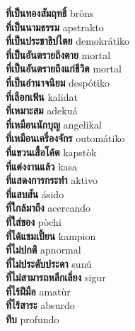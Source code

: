 \textbf{ ที่เป็นทองสัมฤทธิ์  } bròns \\
\textbf{ ที่เป็นนามธรรม  } apstrakto \\
\textbf{ ที่เป็นประชาธิปไตย  } demokrátiko \\
\textbf{ ที่เป็นอันตรายถึงตาย  } mortal \\
\textbf{ ที่เป็นอันตรายถึงแก่ชีวิต  } mortal \\
\textbf{ ที่เป็นอำนาจนิยม  } despótiko \\
\textbf{ ที่เลือกเฟ้น  } kalidat \\
\textbf{ ที่เหมาะสม  } adekuá \\
\textbf{ ที่เหมือนนักบุญ  } angelikal \\
\textbf{ ที่เหมือนเครื่องจักร  } outomátiko \\
\textbf{ ที่แขวนเสื้อโค้ต  } kapstòk \\
\textbf{ ที่แต่งงานแล้ว  } kasa \\
\textbf{ ที่แสดงการกระทำ  } aktivo \\
\textbf{ ที่แสบสัน  } ásido \\
\textbf{ ที่ใกล้มาถึง  } acercando \\
\textbf{ ที่ใส่ของ  } pòchi \\
\textbf{ ที่ได้แชมเปี้ยน  } kampion \\
\textbf{ ที่ไม่ปกติ  } apnormal \\
\textbf{ ที่ไม่ประดับประดา  } sunú \\
\textbf{ ที่ไม่สามารถหลีกเลี่ยง  } sigur \\
\textbf{ ที่ไร้ฝีมือ  } amatùr \\
\textbf{ ที่ไร้สาระ  } absurdo \\
\textbf{ ทึบ  } profundo \\
